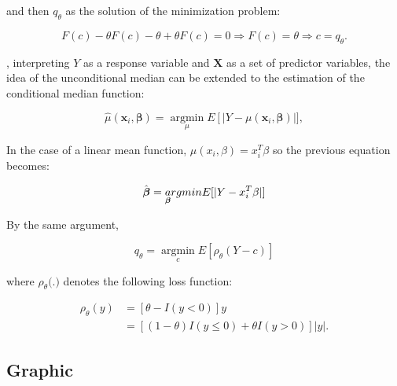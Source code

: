 \documentclass[
  letterpaper,
  DIV=11,
  numbers=noendperiod]{scrreprt}
\begin{document}
and then \(q_\theta\) as the solution of the minimization problem:

\[
F(c)-\theta F(c)-\theta+\theta F(c)=0 \Longrightarrow F(c)=\theta \Longrightarrow c=q_\theta .
\]

, interpreting \(Y\) as a response variable and \(\mathbf{X}\) as a set
of predictor variables, the idea of the unconditional median can be
extended to the estimation of the conditional median function:

\[
\hat{\mu}\left(\mathbf{x}_i, \boldsymbol{\beta}\right)=\underset{\mu}{\operatorname{argmin}} E\left[|Y-\mu\left(\mathbf{x}_i, \boldsymbol{\beta}\right)\right|],
\]

In the case of a linear mean function, \(\mu(x_i, \beta)=x_i^T\beta\) so
the previous equation becomes:

\[
\hat{\boldsymbol{\beta}}=\underset{\boldsymbol{\beta}} argmin \space E[|Y - x_i^T\beta|]
\]

By the same argument,

\[
q_\theta=\underset{c}{\operatorname{argmin}} E\left[\rho_\theta(Y-c)\right]
\]

where \(\rho_\theta(\).\()\) denotes the following loss function:

\[
\begin{aligned}
\rho_\theta(y) & =[\theta-I(y<0)] y \\
& =[(1-\theta) I(y \leq 0)+\theta I(y>0)]|y| .
\end{aligned}
\]

\hypertarget{graphic}{%
\subsection{Graphic}\label{graphic}}
\end{document}
